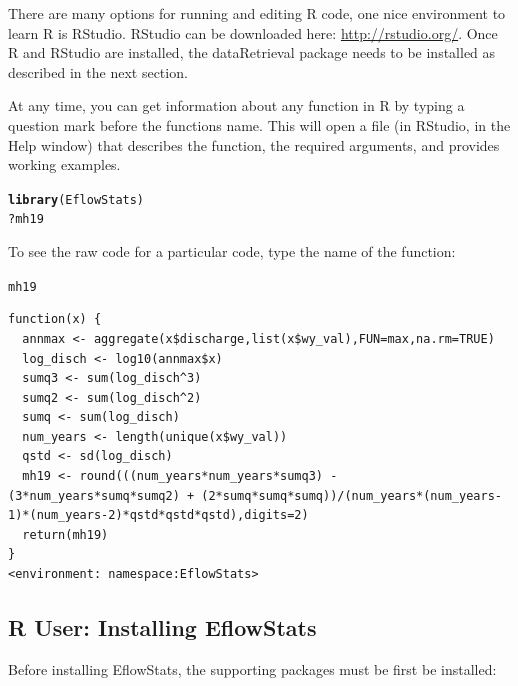 \documentclass[a4paper,11pt]{article}\usepackage[]{graphicx}\usepackage[]{color}
\makeatletter
\newcommand{\hlopt}[1]{\textcolor[rgb]{0,0,0}{#1}}%
\newcommand{\hlstd}[1]{\textcolor[rgb]{0.345,0.345,0.345}{#1}}%
\newcommand{\hlkwd}[1]{\textcolor[rgb]{0.737,0.353,0.396}{\textbf{#1}}}%
\newenvironment{kframe}{%
 \def\at@end@of@kframe{}%
 \ifinner\ifhmode%
  \def\at@end@of@kframe{\end{minipage}}%
  \begin{minipage}{\columnwidth}%
 \fi\fi%
 \def\FrameCommand##1{\hskip\@totalleftmargin \hskip-\fboxsep
 \colorbox{shadecolor}{##1}\hskip-\fboxsep
     \hskip-\linewidth \hskip-\@totalleftmargin \hskip\columnwidth}%
 \MakeFramed {\advance\hsize-\width
   \@totalleftmargin\z@ \linewidth\hsize
   \@setminipage}}%
 {\par\unskip\endMakeFramed%
 \at@end@of@kframe}
\newenvironment{knitrout}{}{} %
\makeatother
\begin{document}
There are many options for running and editing R code, one nice environment to learn R is RStudio. RStudio can be downloaded here: \url{http://rstudio.org/}. Once R and RStudio are installed, the dataRetrieval package needs to be installed as described in the next section.

At any time, you can get information about any function in R by typing a question mark before the functions name.  This will open a file (in RStudio, in the Help window) that describes the function, the required arguments, and provides working examples.

\begin{knitrout}
\color{fgcolor}\begin{kframe}
\begin{alltt}
\hlkwd{library}\hlstd{(EflowStats)}
\hlopt{?}\hlstd{mh19}
\end{alltt}
\end{kframe}
\end{knitrout}

To see the raw code for a particular code, type the name of the function:
\begin{knitrout}
\color{fgcolor}\begin{kframe}
\begin{alltt}
\hlstd{mh19}
\end{alltt}
\begin{verbatim}
function(x) {
  annmax <- aggregate(x$discharge,list(x$wy_val),FUN=max,na.rm=TRUE)
  log_disch <- log10(annmax$x)
  sumq3 <- sum(log_disch^3)
  sumq2 <- sum(log_disch^2)
  sumq <- sum(log_disch)
  num_years <- length(unique(x$wy_val))
  qstd <- sd(log_disch)
  mh19 <- round(((num_years*num_years*sumq3) - (3*num_years*sumq*sumq2) + (2*sumq*sumq*sumq))/(num_years*(num_years-1)*(num_years-2)*qstd*qstd*qstd),digits=2)
  return(mh19)
}
<environment: namespace:EflowStats>
\end{verbatim}
\end{kframe}
\end{knitrout}

\FloatBarrier
\clearpage
\subsection{R User: Installing EflowStats}
Before installing EflowStats, the supporting packages must be first be installed:
\end{document}
